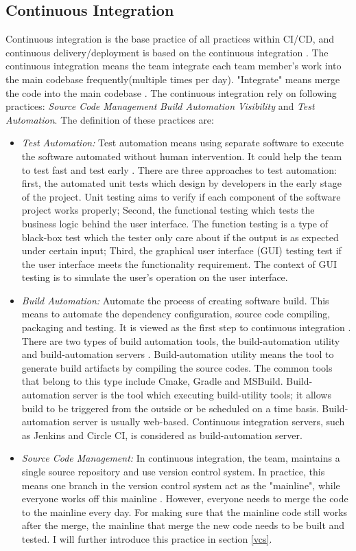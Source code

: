 \subsection{Continuous Integration}
Continuous integration is the base practice of all practices within CI/CD, and continuous delivery/deployment is based on the continuous integration \cite{pittet2018continuous}.
The continuous integration means the team integrate each team member's work into the main codebase frequently(multiple times per day). "Integrate" means merge the code into the main codebase \cite{fowler2006continuous}. The continuous integration rely on following practices: \textit{Source Code Management} \textit{Build Automation} \textit{Visibility} and \textit{Test Automation}. The definition of these practices are:
\begin{itemize}
    \label{TestA}
    \item \textit{Test Automation:} Test automation means using separate software to execute the software automated without human intervention. It could help the team to test fast and test early \cite{Testauto48:online}. There are three approaches to test automation: first, the automated unit tests which design by developers in the early stage of the project. Unit testing aims to verify if each component of the software project works properly; Second, the functional testing which tests the business logic behind the user interface. The function testing is a type of black-box test which the tester only care about if the output is as expected under certain input; Third, the graphical user interface (GUI) testing test if the user interface meets the functionality requirement. The context of GUI testing is to simulate the user's operation on the user interface.
    \item \textit{Build Automation:} Automate the process of creating software build. This means to automate the dependency configuration, source code compiling, packaging and testing. It is viewed as the first step to continuous integration \cite{Buildaut62:online}. There are two types of build automation tools, the build-automation utility and build-automation servers \cite{ceruzzi2003history}. Build-automation utility means the tool to generate build artifacts by compiling the source codes. The common tools that belong to this type include Cmake, Gradle and MSBuild. Build-automation server is the tool which executing build-utility tools; it allows build to be triggered from the outside or be scheduled on a time basis. Build-automation server is usually web-based. Continuous integration servers, such as Jenkins and Circle CI, is considered as build-automation server. 
    \item \textit{Source Code Management:} In continuous integration, the team, maintains a single source repository and use version control system. In practice, this means one branch in the version control system act as the "mainline", while everyone works off this mainline \cite{fowler2006continuous}. However, everyone needs to merge the code to the mainline every day. For making sure that the mainline code still works after the merge, the mainline that merge the new code needs to be built and tested. I will further introduce this practice in section \ref{vcs}. 
\end{itemize}
